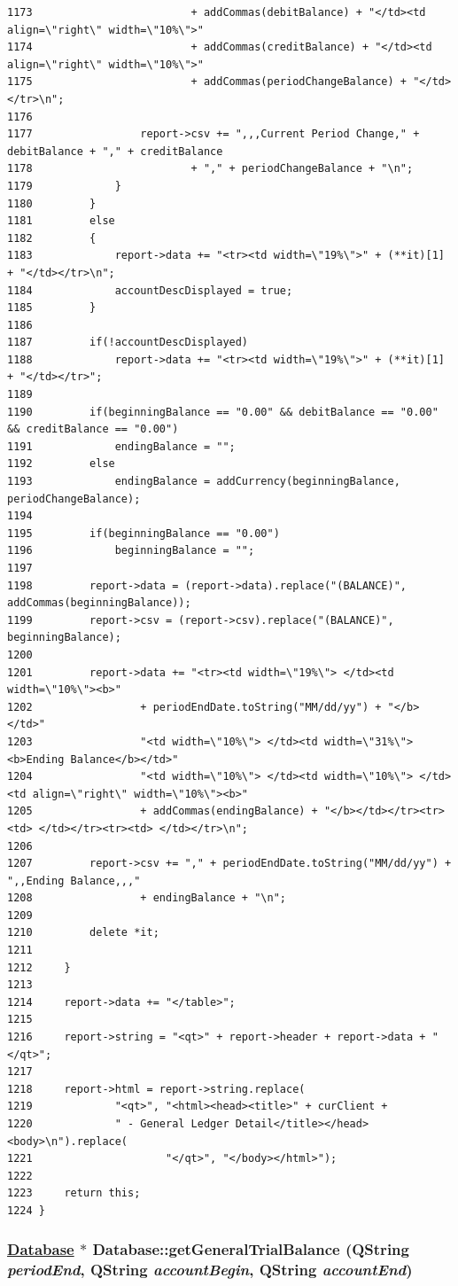 \begin{verbatim}
1173                         + addCommas(debitBalance) + "</td><td align=\"right\" width=\"10%\">"
1174                         + addCommas(creditBalance) + "</td><td align=\"right\" width=\"10%\">"
1175                         + addCommas(periodChangeBalance) + "</td></tr>\n";
1176                 
1177                 report->csv += ",,,Current Period Change," + debitBalance + "," + creditBalance
1178                         + "," + periodChangeBalance + "\n";
1179             }
1180         }
1181         else
1182         {
1183             report->data += "<tr><td width=\"19%\">" + (**it)[1] + "</td></tr>\n";
1184             accountDescDisplayed = true;
1185         }
1186         
1187         if(!accountDescDisplayed)
1188             report->data += "<tr><td width=\"19%\">" + (**it)[1] + "</td></tr>";
1189         
1190         if(beginningBalance == "0.00" && debitBalance == "0.00" && creditBalance == "0.00")
1191             endingBalance = "";
1192         else
1193             endingBalance = addCurrency(beginningBalance, periodChangeBalance);
1194         
1195         if(beginningBalance == "0.00")
1196             beginningBalance = "";
1197         
1198         report->data = (report->data).replace("(BALANCE)", addCommas(beginningBalance));
1199         report->csv = (report->csv).replace("(BALANCE)", beginningBalance);
1200         
1201         report->data += "<tr><td width=\"19%\"> </td><td width=\"10%\"><b>"
1202                 + periodEndDate.toString("MM/dd/yy") + "</b></td>"
1203                 "<td width=\"10%\"> </td><td width=\"31%\"><b>Ending Balance</b></td>"
1204                 "<td width=\"10%\"> </td><td width=\"10%\"> </td><td align=\"right\" width=\"10%\"><b>"
1205                 + addCommas(endingBalance) + "</b></td></tr><tr><td> </td></tr><tr><td> </td></tr>\n";
1206         
1207         report->csv += "," + periodEndDate.toString("MM/dd/yy") + ",,Ending Balance,,,"
1208                 + endingBalance + "\n";
1209 
1210         delete *it;
1211         
1212     }
1213 
1214     report->data += "</table>";
1215     
1216     report->string = "<qt>" + report->header + report->data + "</qt>";
1217     
1218     report->html = report->string.replace(
1219             "<qt>", "<html><head><title>" + curClient +
1220             " - General Ledger Detail</title></head><body>\n").replace(
1221                     "</qt>", "</body></html>");
1222     
1223     return this;
1224 }
\end{verbatim}\normalsize 


\hypertarget{classDatabase_a23}{
\subsubsection[getGeneralTrialBalance]{\setlength{\rightskip}{0pt plus 5cm}\hyperlink{classDatabase}{Database} $\ast$ Database::get\-General\-Trial\-Balance (QString {\em period\-End}, QString {\em account\-Begin}, QString {\em account\-End})}}
\label{classDatabase_a23}


